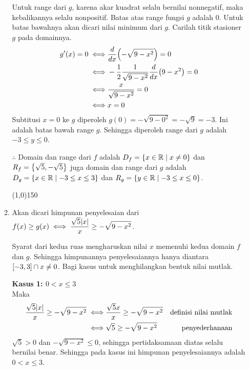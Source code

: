 \begin{enumerate}[leftmargin=*, label={\arabic*}.]
\begin{enumerate}[label={\alph*}.]
    Untuk range dari $g$, karena akar kuadrat selalu bernilai nonnegatif, maka kebalikannya selalu 
    nonpositif. Batas atas range fungsi $g$ adalah $0$. Untuk batas bawahnya akan dicari nilai minimum 
    dari $g$. Carilah titik stasioner $g$ pada domainnya.
    \begin{align*}
        g'(x) = 0 \iff &\drv{x}{-\sqrt{9-x^{2}}} = 0\\
        \iff &-\frac{1}{2}\frac{1}{\sqrt{9-x^{2}}}\drv{x}{9-x^{2}}=0\\
        \iff &\frac{x}{\sqrt{9-x^{2}}} = 0\\
        \iff & x=0
    \end{align*}
    Subtitusi $x=0$ ke $g$ diperoleh $g(0) = -\sqrt{9-0^{2}} = -\sqrt{9}=-3$. Ini adalah batas 
    bawah range $g$. Sehingga diperoleh range dari $g$ adalah $-3 \leq y \leq 0$.

    $\therefore$ Domain dan range dari $f$ adalah $D_f=\set*{x\in \mathbb{R} \mid x\neq 0}$ dan 
    $R_f=\set*{\sqrt{5},-\sqrt{5}}$ juga domain dan range dari $g$ adalah 
    $D_g=\set*{x\in \mathbb{R} \mid -3 \leq x \leq 3}$ dan 
    $R_g=\set*{y\in \mathbb{R} \mid -3 \leq x \leq 0}$.

\begin{center}
    \line(1,0){150}
\end{center}

    \item Akan dicari himpunan penyelesaian dari $\ds f(x) \geq g(x) 
    \iff \frac{\sqrt{5}\abs{x}}{x} \geq -\sqrt{9-x^{2}}$.

    Syarat dari kedua ruas mengharuskan nilai $x$ memenuhi kedua domain $f$ dan $g$. 
    Sehingga himpunannya penyelesaiannya hanya diantara $\cintervalc{-3,3} \cap x \neq 0$.
    Bagi kasus untuk menghilangkan bentuk nilai mutlak.

    \textbf{Kasus 1: $0 < x \leq 3$}\\
    Maka
    \begin{align*}
        \frac{\sqrt{5}\abs{x}}{x} \geq -\sqrt{9-x^{2}}
        \iff &\frac{\sqrt{5}x}{x} \geq -\sqrt{9-x^{2}} 
        &\text{definisi nilai mutlak} \\
        \iff &\sqrt{5} \geq -\sqrt{9-x^{2}}
        &\text{penyederhanaan}
    \end{align*}
    $\sqrt{5}>0$ dan $-\sqrt{9-x^{2}} \leq 0$, sehingga pertidaksamaan diatas selalu 
    bernilai benar. Sehingga pada kasus ini himpunan penyelesaiannya adalah $0 < x \leq 3$.


\end{enumerate}
\end{enumerate}
